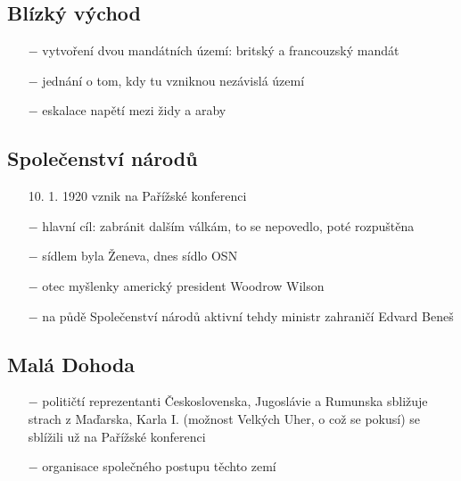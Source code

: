 \documentclass{article}
\begin{document}
\subsection*{Blízký východ}
\begin{itemize}
    \vspace{-0.5em}
    \setlength\itemsep{0.15em}
    \item[$-$] vytvoření dvou mandátních území: britský a francouzský mandát
    \item[$-$] jednání o tom, kdy tu vzniknou nezávislá území
    \item[$-$] eskalace napětí mezi židy a araby
\end{itemize}

\subsection*{Společenství národů}
\begin{itemize}
    \vspace{-0.5em}
    \setlength\itemsep{0.15em}
    \item[10. 1. 1920] vznik na Pařížské konferenci
    \item[$-$] hlavní cíl: zabránit dalším válkám, to se nepovedlo, poté rozpuštěna
    \item[$-$] sídlem byla Ženeva, dnes sídlo OSN
    \item[$-$] otec myšlenky americký president Woodrow Wilson
    \item[$-$] na půdě Společenství národů aktivní tehdy ministr zahraničí Edvard Beneš
\end{itemize}

\subsection*{Malá Dohoda}
\begin{itemize}
    \vspace{-0.5em}
    \setlength\itemsep{0.15em}
    \item[$-$] političtí reprezentanti Československa, Jugoslávie a Rumunska sbližuje strach z Maďarska, Karla I. (možnost Velkých Uher, o což se pokusí) se sblížili už na Pařížské konferenci
    \item[$-$] organisace společného postupu těchto zemí
\end{itemize}
\end{document}
